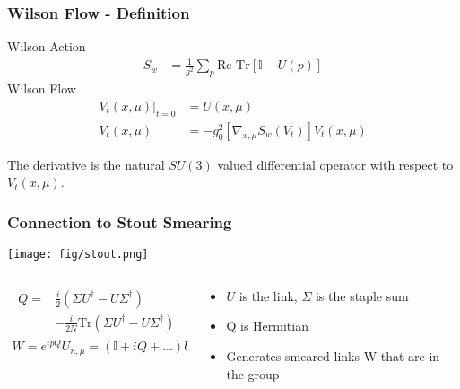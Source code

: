 \begin{frame}
  \frametitle{Wilson Flow - Definition}
    Wilson Action
    \begin{align*}
      S_w &= \frac{1}{g^2} \sum\limits_{p}\text{Re }\text{Tr}[\mathbb{I}-U(p)]
    \end{align*}
    Wilson Flow
    \begin{align*}
      V_t(x,\mu)|_{t=0} &= U(x,\mu) \\
      \dot{V}_t(x,\mu) &= -g_0^2[\nabla_{x,\mu}S_w(V_t)]V_t(x,\mu)
    \end{align*}

    The derivative is the natural $SU(3)$ valued differential operator with respect to $V_t(x,\mu)$.
\end{frame}

\begin{frame}
  \frametitle{Connection to Stout Smearing}
  \begin{center}
    \texttt{[image: fig/stout.png]}
  \end{center}
  \begin{columns}[T]
    \begin{column}{.5\textwidth}
      \begin{block}{}
        \begin{align*}
          Q = & \frac{i}{2}(\Sigma U^{\dagger}-U\Sigma^{\dagger}) \\
              & - \frac{i}{2N}\text{Tr}(\Sigma U^{\dagger}-U\Sigma^{\dagger})
        \end{align*}
        \begin{align*}
          W=e^{ipQ}U_{n,\mu}=(\mathbb{I}+iQ+...)U_{n,\mu}
        \end{align*}
      \end{block}
    \end{column}
    \begin{column}{.5\textwidth}
      \begin{block}{}
        \begin{itemize}
          \item $U$ is the link, $\Sigma$ is the staple sum
          \item Q is Hermitian
          \item Generates smeared links W that are in the group
        \end{itemize}
      \end{block}
    \end{column}
  \end{columns}
\end{frame}

